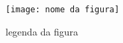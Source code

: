 \documentclass[a4paper]{article}
\begin{document}
\begin{figure}[argumento de posicao]
  \texttt{[image: nome da figura]}\\
  \caption{legenda da figura}
\end{figure}
\end{document}
